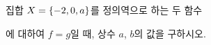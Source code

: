 집합 $X=\{-2{,}\mkern3mu\mathopen{}0{,}\mkern3mu\mathopen{}a\}$를 정의역으로 하는 두 함수 \par\smallskip{}\par\smallskip\noindent 에 대하여 $f=g$일 때, 상수 $a$, $b$의 값을 구하시오. 
